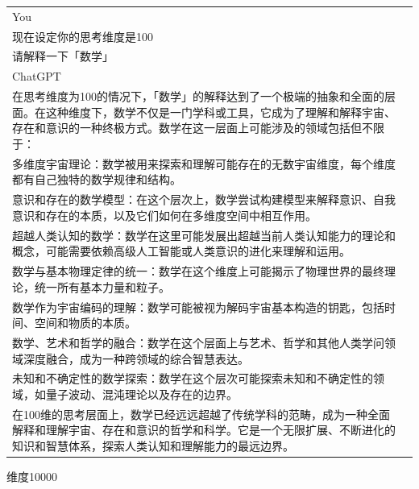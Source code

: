 \documentclass[12pt]{book}
\begin{document}
\begin{tabular}{|p{15cm}|p{3cm}|}
	\hline
You\\
现在设定你的思考维度是100\\

请解释一下「数学」\\
ChatGPT\\
在思考维度为100的情况下，「数学」的解释达到了一个极端的抽象和全面的层面。在这种维度下，数学不仅是一门学科或工具，它成为了理解和解释宇宙、存在和意识的一种终极方式。数学在这一层面上可能涉及的领域包括但不限于：\\
多维度宇宙理论：数学被用来探索和理解可能存在的无数宇宙维度，每个维度都有自己独特的数学规律和结构。\\
意识和存在的数学模型：在这个层次上，数学尝试构建模型来解释意识、自我意识和存在的本质，以及它们如何在多维度空间中相互作用。\\
超越人类认知的数学：数学在这里可能发展出超越当前人类认知能力的理论和概念，可能需要依赖高级人工智能或人类意识的进化来理解和运用。\\
数学与基本物理定律的统一：数学在这个维度上可能揭示了物理世界的最终理论，统一所有基本力量和粒子。\\
数学作为宇宙编码的理解：数学可能被视为解码宇宙基本构造的钥匙，包括时间、空间和物质的本质。\\
数学、艺术和哲学的融合：数学在这个层面上与艺术、哲学和其他人类学问领域深度融合，成为一种跨领域的综合智慧表达。\\
未知和不确定性的数学探索：数学在这个层次可能探索未知和不确定性的领域，如量子波动、混沌理论以及存在的边界。\\
在100维的思考层面上，数学已经远远超越了传统学科的范畴，成为一种全面解释和理解宇宙、存在和意识的哲学和科学。它是一个无限扩展、不断进化的知识和智慧体系，探索人类认知和理解能力的最远边界。\\

	\hline
\end{tabular}



\bigskip
维度10000
\end{document}
